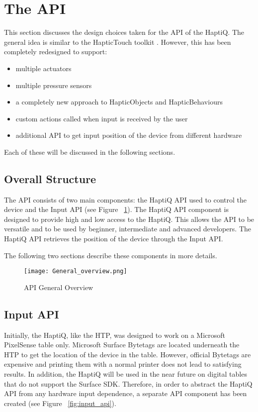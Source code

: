 \section{The API}

This section discusses the design choices taken for the API of the HaptiQ. The general idea is similar to the HapticTouch toolkit \cite{ledo2012haptictouch}. However, this has been completely redesigned to support:

\begin{itemize}
	\item multiple actuators
    \item multiple pressure sensors
    \item a completely new approach to HapticObjects and HapticBehaviours
    \item custom actions called when input is received by the user
    \item additional API to get input position of the device from different hardware
\end{itemize}

Each of these will be discussed in the following sections. 

\subsection{Overall Structure}

The API consists of two main components: the HaptiQ API used to control the device and the Input API (see Figure ~\ref{fig:api}). 
The HaptiQ API component is designed to provide high and low access to the HaptiQ. This allows the API to be versatile and to be used by beginner, intermediate and advanced developers. 
The HaptiQ API retrieves the position of the device through the Input API. 

The following two sections describe these components in more details.

\begin{figure}[H]
  \centering
  \texttt{[image: General\_overview.png]}
  \caption{API General Overview}
  \label{fig:api}
\end{figure}

\subsection{Input API}

Initially, the HaptiQ, like the HTP, was designed to work on a Microsoft PixelSense table only.
Microsoft Surface Bytetags are located underneath the HTP to get the location of the device in the table. However, official Bytetags are expensive and printing them with a normal printer does not lead to satisfying results. In addition, the HaptiQ will be used in the near future on digital tables that do not support the Surface SDK. Therefore, in order to abstract the HaptiQ API from any hardware input dependence, a separate API component has been created (see Figure ~\ref{fig:input_api}). 

